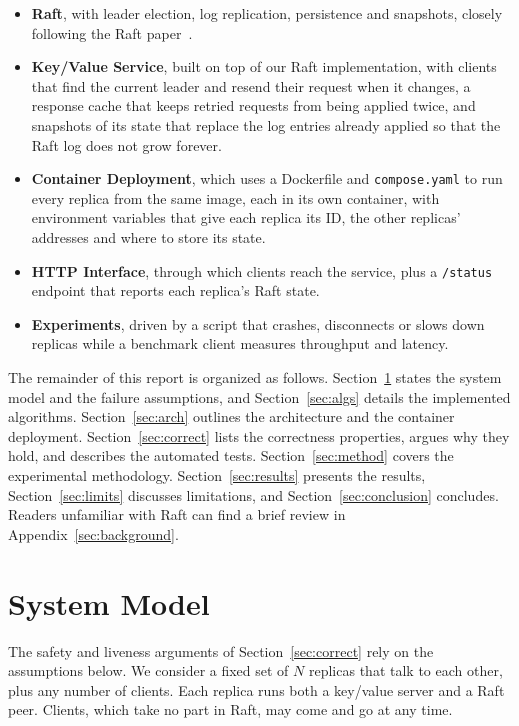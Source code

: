 \documentclass[conference]{IEEEtran}
\begin{document}
\begin{itemize}
\item \textbf{Raft}, with leader election, log replication, persistence and snapshots, closely following the Raft paper~\cite{raft2014}.
\item \textbf{Key/Value Service}, built on top of our Raft implementation, with clients that find the current leader and resend their request when it changes,
a response cache that keeps retried requests from being applied twice, and snapshots of its state that replace the log entries already applied so that the Raft log does not grow forever.
\item \textbf{Container Deployment}, which uses a Dockerfile and \texttt{compose.yaml} to run every replica from the same image, each in its own container,
with environment variables that give each replica its ID, the other replicas' addresses and where to store its state.
\item \textbf{HTTP Interface}, through which clients reach the service, plus a \texttt{/status} endpoint that reports each replica's Raft state.
\item \textbf{Experiments}, driven by a script that crashes, disconnects or slows down replicas while a benchmark client measures throughput and latency.
\end{itemize}

The remainder of this report is organized as follows. Section~\ref{sec:model} states the system model and the failure assumptions, and Section~\ref{sec:algs} details the implemented algorithms.
Section~\ref{sec:arch} outlines the architecture and the container deployment. Section~\ref{sec:correct} lists the correctness properties, argues why they hold,
and describes the automated tests. Section~\ref{sec:method} covers the experimental methodology.
Section~\ref{sec:results} presents the results, Section~\ref{sec:limits} discusses limitations,
and Section~\ref{sec:conclusion} concludes. Readers unfamiliar with Raft can find a brief review in Appendix~\ref{sec:background}.

\section{System Model}\label{sec:model}
The safety and liveness arguments of Section~\ref{sec:correct} rely on the assumptions below. We consider a fixed set of $N$ replicas that talk to each other, plus any number of clients.
Each replica runs both a key/value server and a Raft peer. Clients, which take no part in Raft, may come and go at any time.
\end{document}
